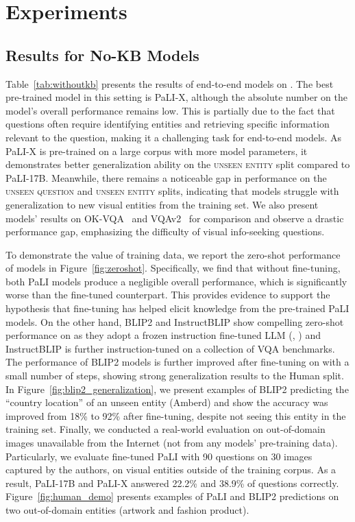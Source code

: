\documentclass[11pt]{article}
\begin{document}
\section{Experiments}
\label{sec:experiment}
\subsection{Results for No-KB Models}
\label{subsec:results_withnokb}
Table~\ref{tab:withoutkb} presents the results of end-to-end models on \infoseek. 
The best pre-trained model in this setting is PaLI-X, although the absolute number on the model's overall performance remains low.
This is partially due to the fact that \infoseek questions often require identifying entities and retrieving specific information relevant to the question, making it a challenging task for end-to-end models.
As PaLI-X is pre-trained on a large corpus with more model parameters, it demonstrates better generalization ability on the \textsc{unseen entity} split compared to PaLI-17B. 
Meanwhile, there remains a noticeable gap in performance on the \textsc{unseen question} and \textsc{unseen entity} splits, indicating that models struggle with generalization to new visual entities from the training set.
We also present models' results on OK-VQA~\cite{marino2019ok} and VQAv2~\cite{balanced_vqa_v2} for comparison and observe a drastic performance gap, emphasizing the difficulty of visual info-seeking questions.

To demonstrate the value of \ourdataset training data, we report the zero-shot performance of models in Figure~\ref{fig:zeroshot}. 
Specifically, we find that without fine-tuning, both PaLI models produce a negligible overall performance, which is significantly worse than the fine-tuned counterpart.
This provides evidence to support the hypothesis that fine-tuning has helped elicit knowledge from the pre-trained PaLI models. 
On the other hand, BLIP2 and InstructBLIP show compelling zero-shot performance on \ourdataset as they adopt a frozen instruction fine-tuned LLM (\ie,  ) and InstructBLIP is further instruction-tuned on a collection of VQA benchmarks.
The performance of BLIP2 models is further improved after fine-tuning on \ourdataset with a small number of steps, showing strong generalization results to the Human split. In Figure~\ref{fig:blip2_generalization}, we present examples of BLIP2 predicting the ``country location'' of an unseen entity (\ie Amberd) and show the accuracy was improved from 18\% to 92\% after fine-tuning, despite not seeing this entity in the training set.
Finally, we conducted a real-world evaluation on out-of-domain images unavailable from the Internet (not from any models' pre-training data).
Particularly, we evaluate fine-tuned PaLI with 90 questions on 30 images captured by the authors, on visual entities outside of the \ourdataset training corpus. 
As a result, PaLI-17B and PaLI-X answered 22.2\% and 38.9\% of questions correctly.
Figure~\ref{fig:human_demo} presents examples of PaLI and BLIP2 predictions on two out-of-domain entities (artwork and fashion product).
\end{document}
